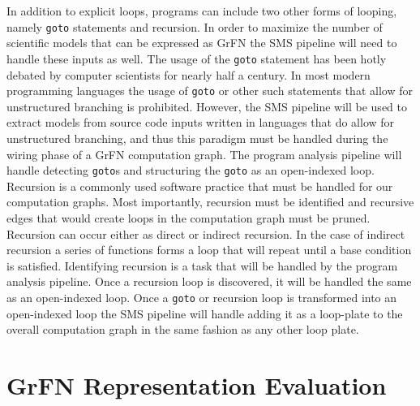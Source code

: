 In addition to explicit loops, programs can include two other forms of looping, namely \texttt{goto} statements and recursion.
In order to maximize the number of scientific models that can be expressed as GrFN the SMS pipeline will need to handle these inputs as well.
The usage of the \texttt{goto} statement has been hotly debated by computer scientists for nearly half a century.
In most modern programming languages the usage of \texttt{goto} or other such statements that allow for unstructured branching is prohibited.
However, the SMS pipeline will be used to extract models from source code inputs written in languages that do allow for unstructured branching, and thus this paradigm must be handled during the wiring phase of a GrFN computation graph.
The program analysis pipeline will handle detecting \texttt{goto}s and structuring the \texttt{goto} as an open-indexed loop.
Recursion is a commonly used software practice that must be handled for our computation graphs.
Most importantly, recursion must be identified and recursive edges that would create loops in the computation graph must be pruned.
Recursion can occur either as direct or indirect recursion.
In the case of indirect recursion a series of functions forms a loop that will repeat until a base condition is satisfied.
Identifying recursion is a task that will be handled by the program analysis pipeline.
Once a recursion loop is discovered, it will be handled the same as an open-indexed loop.
Once a \texttt{goto} or recursion loop is transformed into an open-indexed loop the SMS pipeline will handle adding it as a loop-plate to the overall computation graph in the same fashion as any other loop plate.

\section{GrFN Representation Evaluation\label{sec:rep_eval}}


